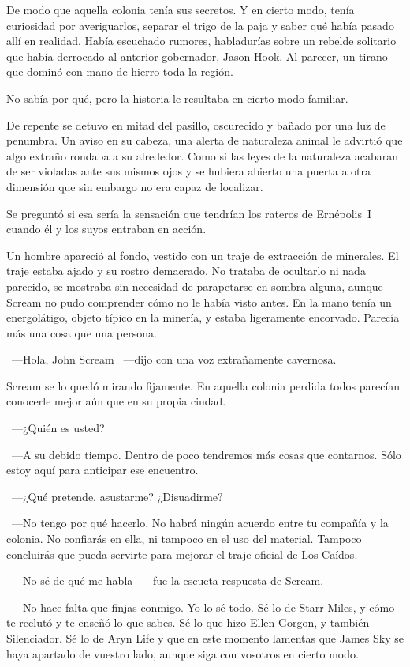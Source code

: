 De modo que aquella colonia tenía sus secretos. Y en cierto modo, tenía curiosidad por averiguarlos, separar el trigo de la paja y saber qué había pasado allí en realidad. Había escuchado rumores, habladurías sobre un rebelde solitario que había derrocado al anterior gobernador, Jason Hook. Al parecer, un tirano que dominó con mano de hierro toda la región.

No sabía por qué, pero la historia le resultaba en cierto modo familiar.

De repente se detuvo en mitad del pasillo, oscurecido y bañado por una luz de penumbra. Un aviso en su cabeza, una alerta de naturaleza animal le advirtió que algo extraño rondaba a su alrededor. Como si las leyes de la naturaleza acabaran de ser violadas ante sus mismos ojos y se hubiera abierto una puerta a otra dimensión que sin embargo no era capaz de localizar.

Se preguntó si esa sería la sensación que tendrían los rateros de Ernépolis~I cuando él y los suyos entraban en acción.

Un hombre apareció al fondo, vestido con un traje de extracción de minerales. El traje estaba ajado y su rostro demacrado. No trataba de ocultarlo ni nada parecido, se mostraba sin necesidad de parapetarse en sombra alguna, aunque Scream no pudo comprender cómo no le había visto antes. En la mano tenía un energolátigo, objeto típico en la minería, y estaba ligeramente encorvado. Parecía más una cosa que una persona.

~---Hola, John Scream ~---dijo con una voz extrañamente cavernosa.

Scream se lo quedó mirando fijamente. En aquella colonia perdida todos parecían conocerle mejor aún que en su propia ciudad.

~---¿Quién es usted?

~---A su debido tiempo. Dentro de poco tendremos más cosas que contarnos. Sólo estoy aquí para anticipar ese encuentro.

~---¿Qué pretende, asustarme? ¿Disuadirme?

~---No tengo por qué hacerlo. No habrá ningún acuerdo entre tu compañía y la colonia. No confiarás en ella, ni tampoco en el uso del material. Tampoco concluirás que pueda servirte para mejorar el traje oficial de Los Caídos.

~---No sé de qué me habla ~---fue la escueta respuesta de Scream.

~---No hace falta que finjas conmigo. Yo lo sé todo. Sé lo de Starr Miles, y cómo te reclutó y te enseñó lo que sabes. Sé lo que hizo Ellen Gorgon, y también Silenciador. Sé lo de Aryn Life y que en este momento lamentas que James Sky se haya apartado de vuestro lado, aunque siga con vosotros en cierto modo.

